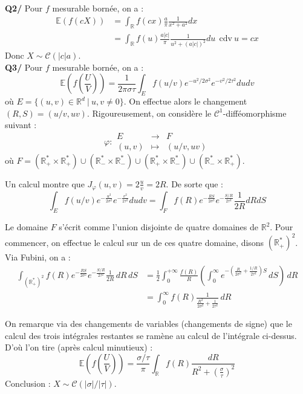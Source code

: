 \documentclass[a4paper,12pt]{article}
\newcommand{\E}{\mathbb{E}}
\begin{document}
\textbf{Q2/} Pour $f$ mesurable bornée, on a :
\begin{align*}
\E (f(cX)) &= \int_{\mathbb{R}} f(cx) \frac{a}{\pi} \frac{1}{x^2 + a^2} dx \\
&= \int_{\mathbb{R}} f(u) \frac{a|c|}{\pi} \frac{1}{u^2 + (a|c|)^2} du \ \ \text{cdv} \ u=cx
\end{align*}
Donc $\boxed{X \sim \mathcal{C} (|c|a)}$. \\

\textbf{Q3/} Pour $f$ mesurable bornée, on a :
$$\E \left(f \left( \frac{U}{V} \right) \right) = \frac{1}{2 \pi \sigma \tau} \int_E f(u/v) e^{-u^2/2\sigma^2}e^{-v^2/2 \tau^2} du dv$$
où $E=\{ (u,v) \in \mathbb{R}^d \ | \ u,v \neq 0 \}$.
On effectue alors le changement $(R,S)=(u/v, uv)$. Rigoureusement, on considère le $\mathcal{C}^1$-difféomorphisme suivant :
$$
\varphi : \begin{array}{rcl}
E & \to & F \\
(u,v) & \mapsto & (u/v, uv)
\end{array}
$$
où $F = (\mathbb{R}_{+}^* \times \mathbb{R}_{+}^*) \cup (\mathbb{R}_{-}^* \times \mathbb{R}_{-}^*) \cup (\mathbb{R}_{+}^* \times \mathbb{R}_{-}^*) \cup (\mathbb{R}_{-}^* \times \mathbb{R}_{+}^*)$.

Un calcul montre que $J_{\varphi}(u,v) = 2\frac{u}{v}=2R$. De sorte que :
$$ \int_E f(u/v) e^{-\frac{u^2}{2 \sigma^2}} e^{- \frac{v^2}{2 \tau^2}} du dv = \int_F f(R) e^{- \frac{RS}{2 \sigma^2}} e^{-\frac{S/R}{2 \tau^2}} \frac{1}{2R} dR dS$$

Le domaine $F$ s'écrit comme l'union disjointe de quatre domaines de $\mathbb{R}^2$. Pour commencer, on effectue le calcul sur un de ces quatre domaine, disons $(\mathbb{R}_+^*)^2$. Via Fubini, on a :
\begin{align*}
\int_{(\mathbb{R}_+^*)^2} f(R) e^{- \frac{RS}{2 \sigma^2}} e^{-\frac{S/R}{2 \tau^2}} \frac{1}{2R} \, dR \, dS 
&= \frac{1}{2} \int_0^{+\infty} \frac{f(R)}{R} \left( \int_0^{\infty} e^{-\left(\frac{R}{2\sigma^2} + \frac{1/R}{2\tau^2}\right)S} \, dS \right) \, dR \\
&= \int_{0}^{\infty} f(R) \frac{1}{\frac{R^2}{2\sigma^2} + \frac{1}{2\tau^2}} \, dR
\end{align*}

On remarque via des changements de variables (changements de signe) que le calcul des trois intégrales restantes se ramène au calcul de l'intégrale ci-dessus. D'où l'on tire (après calcul minutieux) : 
$$\E \left(f \left( \frac{U}{V} \right) \right) = \frac{\sigma / \tau}{\pi} \int_{\mathbb{R}} f(R) \frac{dR}{R^2+ \left( \frac{\sigma}{\tau} \right)^2}$$
Conclusion : $\boxed{X \sim \mathcal{C}(| \sigma | / |\tau| )}$. \\
\end{document}
